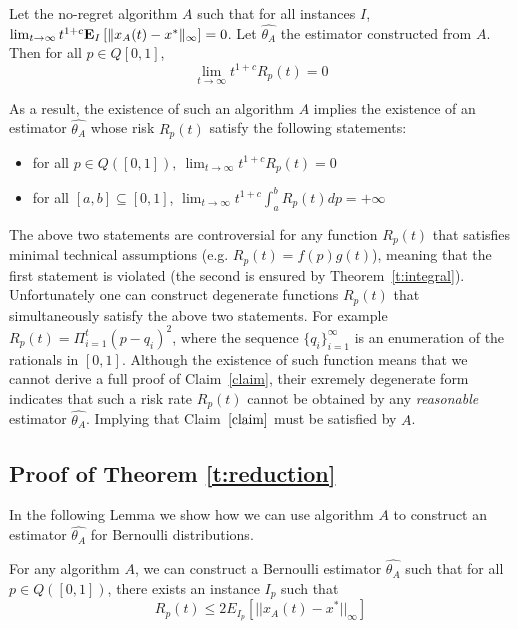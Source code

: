 \begin{theorem}\label{t:reduction}
Let the no-regret algorithm $A$ such that for all instances $I$, $\lim_{t \rightarrow \infty} t^{1+c} \bm{\mathrm{E}}_{I} \left[ \| x_A(t)-x^* \|_{\infty} \right]=0$.
Let $\hat{\theta_A}$ the estimator constructed from $A$. Then for all  $p \in Q[0,1]$, \[\lim_{t \rightarrow \infty}t^{1+c}R_p(t)=0\]
\end{theorem}

\noindent As a result, the existence of such an algorithm $A$ implies the existence of an estimator $\hat{\theta_A}$
whose risk $R_p(t)$ satisfy the following statements:

\begin{itemize}
 \item for all $p \in Q([0,1]),~ \lim_{t \rightarrow \infty}t^{1+c}R_p(t)=0$
 \item for all $[a,b] \subseteq [0,1]$, $\lim_{t \to \infty}t^{1+c} \int_{a}^{b}R_p(t)dp = +\infty$
\end{itemize}


The above two statements are controversial for any function $R_p(t)$ that satisfies minimal technical
assumptions (e.g. $R_p(t)=f(p)g(t)$), meaning that the first statement is violated (the second is ensured
by Theorem~\ref{t:integral}). Unfortunately one can construct degenerate functions $R_p(t)$
that simultaneously satisfy the above two statements. For example $R_p(t)=\Pi_{i=1}^t(p-q_i)^2$,
where the sequence $\{q_i\}_{i=1}^{\infty}$ is an enumeration of the rationals in $[0,1]$. Although
the existence of such function means that we cannot derive a full proof of Claim~\ref{claim}, their
exremely degenerate form indicates that such a risk rate $R_p(t)$ cannot be obtained by any
\emph{reasonable} estimator $\hat{\theta_A}$. Implying that Claim~$\ref{claim}$ must be satisfied by
$A$.

\subsection{Proof of Theorem \ref{t:reduction}}
\noindent In the following Lemma we show how we can use algorithm $A$ to construct an estimator $\hat{\theta_A}$ for Bernoulli distributions.
\begin{lemma}\label{l:reduction}
For any algorithm $A$, we can construct a Bernoulli estimator $\hat{\theta_A}$ such that for all $p \in Q([0,1])$, there exists an instance $I_p$ such that $$R_p(t) \leq 2E_{I_p}[||x_A(t)-x^*||_{\infty}]$$
\end{lemma}

